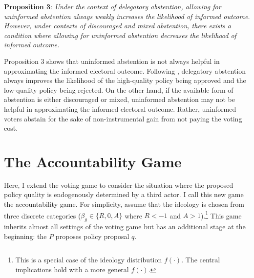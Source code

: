 \documentclass[letterpaper, 12pt]{article}
\begin{document}
    \noindent \textbf{Proposition 3}: \textit{Under the context of delegatory abstention, allowing for uninformed abstention always weakly increases the likelihood of informed outcome. However, under contexts of discouraged and mixed abstention, there exists a condition where allowing for uninformed abstention decreases the likelihood of informed outcome.}
    
    \noindent Proposition 3 shows that uninformed abstention is not always helpful in approximating the informed electoral outcome. Following \cite{Feddersen1996thsw}, delegatory abstention always improves the likelihood of the high-quality policy being approved and the low-quality policy being rejected. On the other hand, if the available form of abstention is either discouraged or mixed, uninformed abstention may not be helpful in approximating the informed electoral outcome. Rather, uninformed voters abstain for the sake of non-instrumental gain from not paying the voting cost.
    
    \section*{The Accountability Game}
    
    \par Here, I extend the voting game to consider the situation where the proposed policy quality is endogenously determined by a third actor. I call this new game the accountability game. For simplicity, assume that the ideology is chosen from three discrete categories ($\beta_g \in \{R, 0, A\}$ where $R<-1$ and $A>1$).\footnote{This is a special case of the ideology distribution $f(\cdot)$. The central implications hold with a more general $f(\cdot)$.} This game inherits almost all settings of the voting game but has an additional stage at the beginning: the $P$ proposes policy proposal $q$.
    
\end{document}
